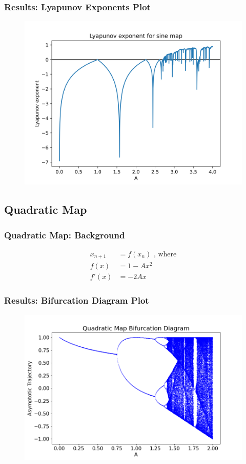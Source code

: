 \documentclass[
	11pt, %
	aspectratio=169, %
]{beamer}
\begin{document}

\begin{frame}
        \frametitle{Results: Lyapunov Exponents Plot}
    \begin{figure}
        \includegraphics[width=0.6\linewidth]
        {sine_lyapunov_exp.png}
    \end{figure}
\end{frame}


\subsection{Quadratic Map}

\begin{frame}
        \frametitle{Quadratic Map: Background}
        \begin{align*}
            x_{n+1} &= f(x_n) \text{ , where}\\
            f(x) &= 1 - Ax^2 \\
            f'(x) &= -2Ax
        \end{align*}
\end{frame}


\begin{frame}
        \frametitle{Results: Bifurcation Diagram Plot}
        \begin{figure}
            \includegraphics[width=0.6\linewidth]
            {quadratic_bifurcation_diagram.png}
        \end{figure}
\end{frame}
\end{document}

